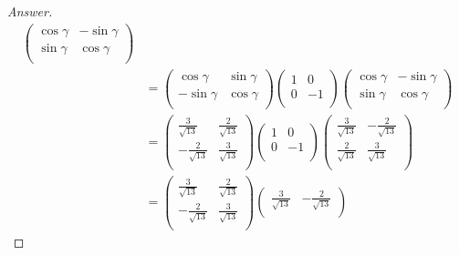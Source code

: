 \documentclass[../psets.tex]{subfiles}
\begin{document}
\begin{enumerate}[label={\textbf{5.\arabic*.}}]
\begin{proof}[Answer]
\begin{align*}
\begin{pmatrix}
                \cos\gamma & -\sin\gamma\\
                \sin\gamma & \cos\gamma\\
            \end{pmatrix}\\
            &=
            \begin{pmatrix}
                \cos\gamma & \sin\gamma\\
                -\sin\gamma & \cos\gamma\\
            \end{pmatrix}
            \begin{pmatrix}
                1 & 0\\
                0 & -1\\
            \end{pmatrix}
            \begin{pmatrix}
                \cos\gamma & -\sin\gamma\\
                \sin\gamma & \cos\gamma\\
            \end{pmatrix}\\
            &=
            \begin{pmatrix}
                \frac{3}{\sqrt{13}} & \frac{2}{\sqrt{13}}\\
                -\frac{2}{\sqrt{13}} & \frac{3}{\sqrt{13}}\\
            \end{pmatrix}
            \begin{pmatrix}
                1 & 0\\
                0 & -1\\
            \end{pmatrix}
            \begin{pmatrix}
                \frac{3}{\sqrt{13}} & -\frac{2}{\sqrt{13}}\\
                \frac{2}{\sqrt{13}} & \frac{3}{\sqrt{13}}\\
            \end{pmatrix}\\
            &=
            \begin{pmatrix}
                \frac{3}{\sqrt{13}} & \frac{2}{\sqrt{13}}\\
                -\frac{2}{\sqrt{13}} & \frac{3}{\sqrt{13}}\\
            \end{pmatrix}
            \begin{pmatrix}
                \frac{3}{\sqrt{13}} & -\frac{2}{\sqrt{13}}\\

\end{pmatrix}
\end{align*}
\end{proof}
\end{enumerate}
\end{document}
